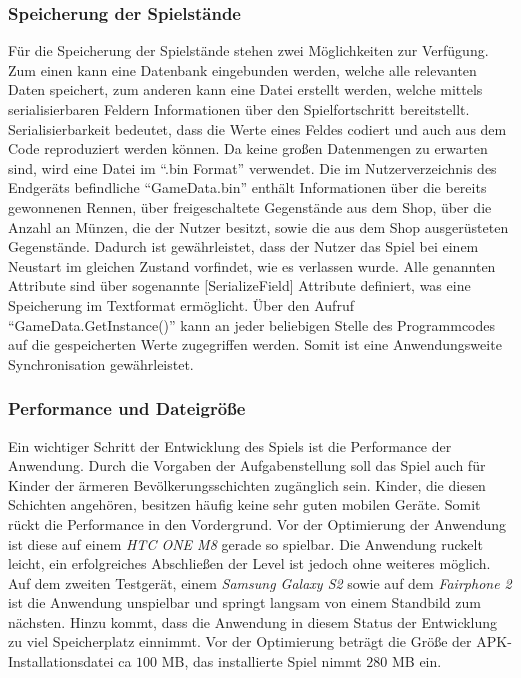 	\subsubsection{Speicherung der Spielstände\label{speicherung}}
	Für die Speicherung der Spielstände stehen zwei Möglichkeiten zur Verfügung. Zum einen kann eine Datenbank eingebunden werden, welche alle relevanten Daten speichert, zum anderen kann eine Datei erstellt werden, welche mittels serialisierbaren Feldern Informationen über den Spielfortschritt bereitstellt. Serialisierbarkeit bedeutet, dass die Werte eines Feldes codiert und auch aus dem Code reproduziert werden können.
	Da keine großen Datenmengen zu erwarten sind, wird eine Datei im \enquote{.bin Format} verwendet.
	Die im Nutzerverzeichnis des Endgeräts befindliche \enquote{GameData.bin} enthält Informationen über die bereits gewonnenen Rennen, über freigeschaltete Gegenstände aus dem Shop, über die Anzahl an Münzen, die der Nutzer besitzt, sowie die aus dem Shop ausgerüsteten Gegenstände. Dadurch ist gewährleistet, dass der Nutzer das Spiel bei einem Neustart im gleichen Zustand vorfindet, wie es verlassen wurde.
	Alle genannten Attribute sind über sogenannte [SerializeField] Attribute definiert, was eine Speicherung im Textformat ermöglicht. Über den Aufruf \enquote{GameData.GetInstance()} kann an jeder beliebigen Stelle des Programmcodes auf die gespeicherten Werte zugegriffen werden. Somit ist eine Anwendungsweite Synchronisation gewährleistet.

	\subsubsection{Performance und Dateigröße}
	Ein wichtiger Schritt der Entwicklung des Spiels ist die Performance der Anwendung. Durch die Vorgaben der Aufgabenstellung soll das Spiel auch für Kinder der ärmeren Bevölkerungsschichten zugänglich sein. Kinder, die diesen Schichten angehören, besitzen häufig keine sehr guten mobilen Geräte. Somit rückt die Performance in den Vordergrund.
	Vor der Optimierung der Anwendung ist diese auf einem \emph{HTC ONE M8} gerade so spielbar. Die Anwendung ruckelt leicht, ein erfolgreiches Abschließen der Level ist jedoch ohne weiteres möglich. Auf dem zweiten Testgerät, einem \emph{Samsung Galaxy S2} sowie auf dem \emph{Fairphone 2} ist die Anwendung unspielbar und springt langsam von einem Standbild zum nächsten.
	Hinzu kommt, dass die Anwendung in diesem Status der Entwicklung zu viel Speicherplatz einnimmt. Vor der Optimierung beträgt die Größe der APK-Installationsdatei ca $100$ MB, das installierte Spiel nimmt $280$ MB ein.

